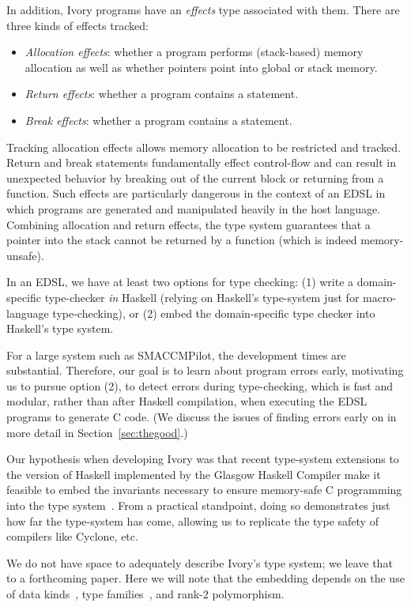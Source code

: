 In addition, Ivory programs have an \emph{effects} type associated with them.
There are three kinds of effects tracked:
\begin{itemize}
  \item \emph{Allocation effects}: whether a program performs (stack-based)
    memory allocation as well as whether pointers point into global or stack memory.
  \item \emph{Return effects}: whether a program contains a  statement.
  \item \emph{Break effects}: whether a program contains a 
    statement.
\end{itemize}
\noindent
Tracking allocation effects allows memory allocation to be restricted and
tracked.  Return and break statements fundamentally effect control-flow and can
result in unexpected behavior by breaking out of the current block or returning
from a function.  Such effects are particularly dangerous in the context of an
EDSL in which programs are generated and manipulated heavily in the host
language.  Combining allocation and return effects, the type system guarantees
that a pointer into the stack cannot be returned by a function (which is indeed
memory-unsafe).

In an EDSL, we have at least two options for type checking: (1) write a
domain-specific type-checker \emph{in} Haskell (relying on Haskell's type-system
just for macro-language type-checking), or (2) embed the domain-specific type
checker into Haskell's type system.

For a large system such as SMACCMPilot, the development times are substantial.
Therefore, our goal is to learn about program errors early, motivating us to
pursue option (2), to detect errors during type-checking, which is fast and
modular, rather than after Haskell compilation, when executing the EDSL programs
to generate C code.  (We discuss the issues of finding errors early on in more
detail in Section~\ref{sec:thegood}.)

Our hypothesis when developing Ivory was that recent type-system extensions to
the version of Haskell implemented by the Glasgow Haskell Compiler make it
feasible to embed the invariants necessary to ensure memory-safe C programming
into the type system~\cite{dephaskell}.  From a practical standpoint, doing so
demonstrates just how far the type-system has come, allowing us to replicate the
type safety of compilers like Cyclone, etc.

We do not have space to adequately describe Ivory's type system; we leave that
to a forthcoming paper.  Here we will note that the embedding depends on the use
of data kinds~\cite{datakinds}, type families~\cite{typefamilies}, and rank-2
polymorphism\cite{stmonad}.

